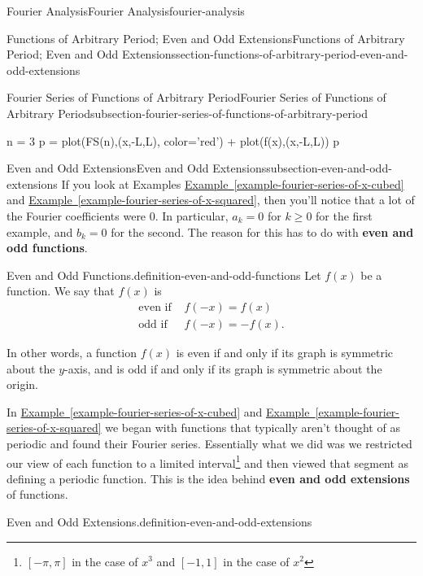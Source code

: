 \documentclass[oneside,10pt,]{book}
\newcommand{\terminology}[1]{\textbf{#1}}
\numberwithin{equation}{section}
\newcommand{\amp}{&}
\begin{document}
\begin{chapterptx}{Fourier Analysis}{}{Fourier Analysis}{}{}{fourier-analysis}
\begin{sectionptx}{Functions of Arbitrary Period; Even and Odd Extensions}{}{Functions of Arbitrary Period; Even and Odd Extensions}{}{}{section-functions-of-arbitrary-period-even-and-odd-extensions}
\begin{subsectionptx}{Fourier Series of Functions of Arbitrary Period}{}{Fourier Series of Functions of Arbitrary Period}{}{}{subsection-fourier-series-of-functions-of-arbitrary-period}
\begin{sageinput}
n = 3
p = plot(FS(n),(x,-L,L), color='red') + plot(f(x),(x,-L,L))
p
\end{sageinput}
\end{subsectionptx}
%
%
\typeout{************************************************}
\typeout{************************************************}
%
\begin{subsectionptx}{Even and Odd Extensions}{}{Even and Odd Extensions}{}{}{subsection-even-and-odd-extensions}
\hypertarget{p-592}{}%
If you look at Examples \hyperref[example-fourier-series-of-x-cubed]{Example~\ref{example-fourier-series-of-x-cubed}} and \hyperref[example-fourier-series-of-x-squared]{Example~\ref{example-fourier-series-of-x-squared}}, then you'll notice that a lot of the Fourier coefficients were \(0\). In particular, \(a_{k} = 0\) for \(k\geq0\) for the first example, and \(b_{k}=0\) for the second. The reason for this has to do with \terminology{even and odd functions}.%
\begin{definition}{Even and Odd Functions.}{definition-even-and-odd-functions}%
\hypertarget{p-593}{}%
Let \(f(x)\) be a function. We say that \(f(x)\) is%
\begin{align*}
\text{even if } \amp f(-x) = f(x)\\
\text{odd if } \amp f(-x) = -f(x).
\end{align*}
%
\end{definition}
\hypertarget{p-594}{}%
In other words, a function \(f(x)\) is even if and only if its graph is symmetric about the \(y\)-axis, and is odd if and only if its graph is symmetric about the origin.%
\par
\hypertarget{p-595}{}%
In \hyperref[example-fourier-series-of-x-cubed]{Example~\ref{example-fourier-series-of-x-cubed}} and \hyperref[example-fourier-series-of-x-squared]{Example~\ref{example-fourier-series-of-x-squared}} we began with functions that typically aren't thought of as periodic and found their Fourier series. Essentially what we did was we restricted our view of each function to a limited interval\footnote{\([-\pi,\pi]\) in the case of \(x^{3}\) and \([-1,1]\) in the case of \(x^{2}\)\label{footnote-periodic-extensions}} and then viewed that segment as defining a periodic function. This is the idea behind \terminology{even and odd extensions} of functions.%
\begin{definition}{Even and Odd Extensions.}{definition-even-and-odd-extensions}%
\hypertarget{p-596}{}%

\end{definition}
\end{subsectionptx}
\end{sectionptx}
\end{chapterptx}
\end{document}
